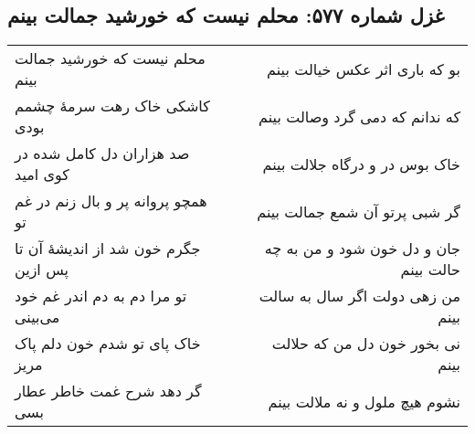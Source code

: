 \begin{center}
\section*{غزل شماره ۵۷۷: محلم نیست که خورشید جمالت بینم}
\label{sec:577}
\begin{longtable}{l p{0.5cm} r}
محلم نیست که خورشید جمالت بینم
&&
بو که باری اثر عکس خیالت بینم
\\
کاشکی خاک رهت سرمهٔ چشمم بودی
&&
که ندانم که دمی گرد وصالت بینم
\\
صد هزاران دل کامل شده در کوی امید
&&
خاک بوس در و درگاه جلالت بینم
\\
همچو پروانه پر و بال زنم در غم تو
&&
گر شبی پرتو آن شمع جمالت بینم
\\
جگرم خون شد از اندیشهٔ آن تا پس ازین
&&
جان و دل خون شود و من به چه حالت بینم
\\
تو مرا دم به دم اندر غم خود می‌بینی
&&
من زهی دولت اگر سال به سالت بینم
\\
خاک پای تو شدم خون دلم پاک مریز
&&
نی بخور خون دل من که حلالت بینم
\\
گر دهد شرح غمت خاطر عطار بسی
&&
نشوم هیچ ملول و نه ملالت بینم
\\
\end{longtable}
\end{center}
